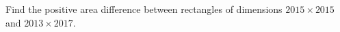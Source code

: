Find the positive area difference between rectangles of dimensions $2015\times2015$ and $2013\times2017$.
